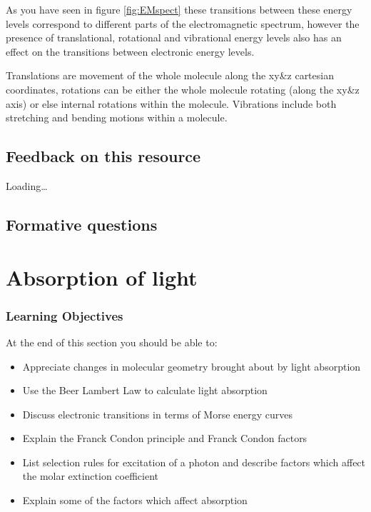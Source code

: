 \documentclass[
]{book}
\providecommand{\tightlist}{%
  \setlength{\itemsep}{0pt}\setlength{\parskip}{0pt}}
\begin{document}
As you have seen in figure \ref{fig:EMspect} these transitions between these energy levels correspond to different parts of the electromagnetic spectrum, however the presence of translational, rotational and vibrational energy levels also has an effect on the transitions between electronic energy levels.

Translations are movement of the whole molecule along the xy\&z cartesian coordinates, rotations can be either the whole molecule rotating (along the xy\&z axis) or else internal rotations within the molecule. Vibrations include both stretching and bending motions within a molecule.

\hypertarget{feedback-on-this-resource}{%
\section*{Feedback on this resource}\label{feedback-on-this-resource}}

Loading\ldots{}

\hypertarget{subsec:introqs}{%
\section{Formative questions}\label{subsec:introqs}}

\hypertarget{chAbs}{%
\chapter{Absorption of light}\label{chAbs}}

\hypertarget{sec:AbsLOs}{%
\subsection{Learning Objectives}\label{sec:AbsLOs}}

At the end of this section you should be able to:

\begin{itemize}
\tightlist
\item
  Appreciate changes in molecular geometry brought about by light absorption
\item
  Use the Beer Lambert Law to calculate light absorption
\item
  Discuss electronic transitions in terms of Morse energy curves
\item
  Explain the Franck Condon principle and Franck Condon factors
\item
  List selection rules for excitation of a photon and describe factors which affect the molar extinction coefficient
\item
  Explain some of the factors which affect absorption
\end{itemize}
\end{document}
